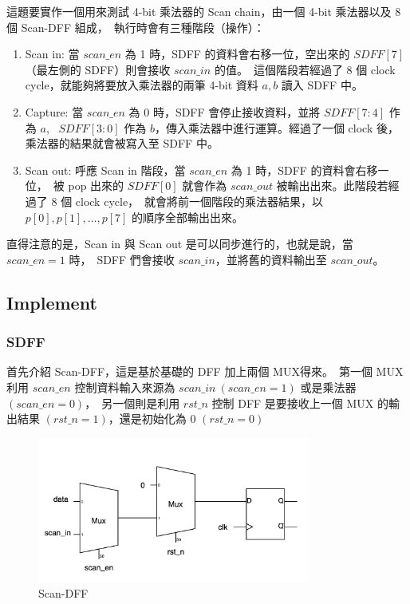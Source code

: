 \documentclass[10.5pt,compsoc,UTF8]{CjC}
\theoremstyle{mystyle}
\begin{document}
這題要實作一個用來測試 4-bit 乘法器的 Scan chain，由一個 4-bit 乘法器以及 8 個 Scan-DFF 組成，\
執行時會有三種階段（操作）：
\begin{enumerate}
  \item Scan in: 當 $scan\_en$ 為 1 時，SDFF 的資料會右移一位，空出來的 $SDFF[7]$（最左側的 SDFF）則會接收 $scan\_in$ 的值。\
  這個階段若經過了 8 個 clock cycle，就能夠將要放入乘法器的兩筆 4-bit 資料 $a, b$ 讀入 SDFF 中。
  \item Capture: 當 $scan\_en$ 為 0 時，SDFF 會停止接收資料，並將 $SDFF[7:4]$ 作為 $a$, \
  $SDFF[3:0]$ 作為 $b$，傳入乘法器中進行運算。經過了一個 clock 後，乘法器的結果就會被寫入至 SDFF 中。
  \item Scan out: 呼應 Scan in 階段，當 $scan\_en$ 為 1 時，SDFF 的資料會右移一位，\
  被 pop 出來的 $SDFF[0]$ 就會作為 $scan\_out$ 被輸出出來。此階段若經過了 $8$ 個 clock cycle，\
  就會將前一個階段的乘法器結果，以 $p[0], p[1], \dots, p[7]$ 的順序全部輸出出來。
\end{enumerate}

直得注意的是，Scan in 與 Scan out 是可以同步進行的，也就是說，當 $scan\_en = 1$ 時，\
SDFF 們會接收 $scan\_in$，並將舊的資料輸出至 $scan\_out$。

\subsection{Implement}

\subsubsection*{SDFF}
首先介紹 Scan-DFF，這是基於基礎的 DFF 加上兩個 MUX得來。\
第一個 MUX 利用 $scan\_en$ 控制資料輸入來源為 $scan\_in\ (scan\_en = 1)$ 或是乘法器 $(scan\_en = 0)$，\
另一個則是利用 $rst\_n$ 控制 DFF 是要接收上一個 MUX 的輸出結果 $(rst\_n = 1)$，還是初始化為 0 $(rst\_n = 0)$

\begin{figure}[h!]
  \centering
  \includegraphics[width=0.8\textwidth]{./img/Q2-SDFF.png}
  \caption{Scan-DFF}
  \label{fig:SDFF}
\end{figure}
\end{document}
